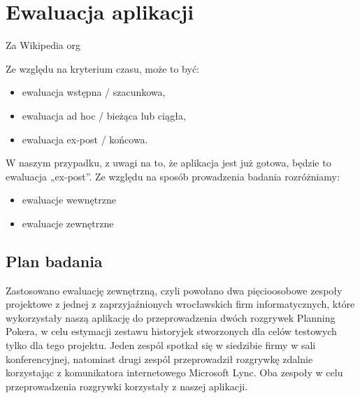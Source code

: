 ﻿\chapter{Ewaluacja aplikacji}

Za Wikipedia org 
\begin{quote}
\end{quote}
Ze względu na kryterium czasu, może to być:
\begin{itemize}
    \item ewaluacja wstępna / szacunkowa,
    \item ewaluacja ad hoc / bieżąca lub ciągła,
    \item ewaluacja ex-post / końcowa.
\end{itemize}
W naszym przypadku, z uwagi na to, że aplikacja jest już gotowa, będzie to ewaluacja „ex-post”. \newline
Ze względu na sposób prowadzenia badania rozróżniamy:
\begin{itemize}
    \item ewaluacje wewnętrzne
    \item ewaluacje zewnętrzne
\end{itemize}

\section{Plan badania}
Zastosowano ewaluację zewnętrzną, czyli powołano dwa pięcioosobowe zespoły projektowe z
jednej z zaprzyjaźnionych wrocławskich firm informatycznych, które wykorzystały naszą aplikację do
przeprowadzenia dwóch rozgrywek Planning Pokera, w celu estymacji zestawu historyjek stworzonych dla
celów testowych tylko dla tego projektu. Jeden zespól spotkał się w siedzibie firmy w sali konferencyjnej,
natomiast drugi zespól przeprowadził rozgrywkę zdalnie korzystając z komunikatora internetowego Microsoft
Lync. Oba zespoły w celu przeprowadzenia rozgrywki korzystały z naszej aplikacji.
